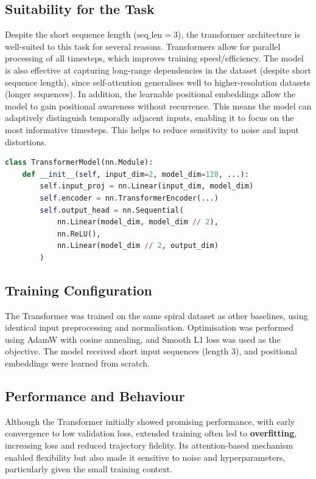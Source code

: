 \subsection*{Suitability for the Task}

Despite the short sequence length ($\text{seq\_len} = 3$), the transformer architecture is well-suited to this task for several reasons. Transformers allow for parallel processing of all timesteps, which improves training speed/efficiency. The model is also effective at capturing long-range dependencies in the dataset (despite short sequence length), since self-attention generalises well to higher-resolution datasets (longer sequences). In addition, the learnable positional embeddings allow the model to gain positional awareness without recurrence. This means the model can adaptively distinguish temporally adjacent inputs, enabling it to  focus on the most informative timesteps. This helps to reduce sensitivity to noise and input distortions.

\begin{lstlisting}[language=Python, caption={Simplified Transformer architecture}]
class TransformerModel(nn.Module):
    def __init__(self, input_dim=2, model_dim=128, ...):
        self.input_proj = nn.Linear(input_dim, model_dim)
        self.encoder = nn.TransformerEncoder(...)
        self.output_head = nn.Sequential(
            nn.Linear(model_dim, model_dim // 2),
            nn.ReLU(),
            nn.Linear(model_dim // 2, output_dim)
        )
\end{lstlisting}

\subsection*{Training Configuration}
The Transformer was trained on the same spiral dataset as other baselines, using identical input preprocessing and normalisation. Optimisation was performed using AdamW with cosine annealing, and Smooth L1 loss was used as the objective. The model received short input sequences (length 3), and positional embeddings were learned from scratch.

\subsection*{Performance and Behaviour}
Although the Transformer initially showed promising performance, with early convergence to low validation loss, extended training often led to \textbf{overfitting}, increasing loss and reduced trajectory fidelity. Its attention-based mechanism enabled flexibility but also made it sensitive to noise and hyperparameters, particularly given the small training context.

